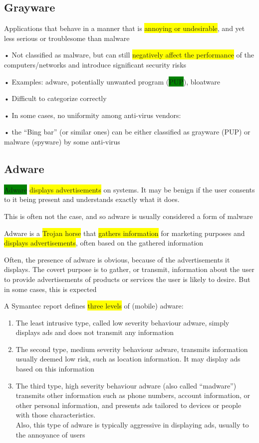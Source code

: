 \documentclass[]{project_plan}
\begin{document}
\subsection{Grayware}

Applications that behave in a manner that is \colorbox{yellow}{annoying or undesirable}, and yet less serious
or troublesome than malware

• Not classified as malware, but can still \colorbox{yellow}{negatively affect the performance} of the
computers/networks and introduce significant security risks

• Examples: adware, potentially unwanted program (\colorbox{green}{PUP}), bloatware

• Difficult to categorize correctly

• In some cases, no uniformity among anti-virus vendors:

• the “Bing bar” (or similar ones) can be either classified as grayware (PUP) or malware
(spyware) by some anti-virus

\subsection{Adware}

\colorbox{green}{Adware} \colorbox{yellow}{displays advertisements} on systems. It may be benign if the user consents to it being
present and understands exactly what it does.

This is often not the case, and so adware is usually considered a form of malware

Adware is a \colorbox{yellow}{Trojan horse} that \colorbox{yellow}{gathers information} for marketing purposes and
\colorbox{yellow}{displays advertisements}, often based on the gathered information

Often, the presence of adware is obvious, because of the advertisements it displays. The covert
purpose is to gather, or transmit, information about the user to provide advertisements of
products or services the user is likely to desire. But in some cases, this is expected

A Symantec report defines \colorbox{yellow}{three levels} of (mobile) adware:\\
\begin{enumerate}
  \item The least intrusive type, called low severity behaviour adware, simply displays ads and does
        not transmit any information
  \item The second type, medium severity behaviour adware, transmits information usually deemed
        low risk, such as location information. It may display ads based on this information
  \item The third type, high severity behaviour adware (also called “madware”) transmits other
        information such as phone numbers, account information, or other personal information, and
        presents ads tailored to devices or people with those characteristics.\\Also, this type of adware is
        typically aggressive in displaying ads, usually to the annoyance of users
\end{enumerate}
\end{document}
